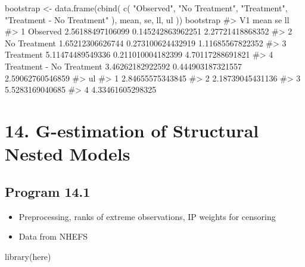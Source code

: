 \documentclass[
  10pt,
  a4paper,
]{book}
\newenvironment{Shaded}{\begin{snugshade}}{\end{snugshade}}
\newcommand{\CommentTok}[1]{\textcolor[rgb]{0.37,0.37,0.37}{#1}}
\newcommand{\FunctionTok}[1]{\textcolor[rgb]{0.28,0.35,0.67}{#1}}
\newcommand{\NormalTok}[1]{\textcolor[rgb]{0.00,0.46,0.62}{#1}}
\newcommand{\OtherTok}[1]{\textcolor[rgb]{0.00,0.46,0.62}{#1}}
\newcommand{\StringTok}[1]{\textcolor[rgb]{0.13,0.47,0.30}{#1}}
\providecommand{\tightlist}{%
  \setlength{\itemsep}{0pt}\setlength{\parskip}{0pt}}
\begin{document}
\begin{Shaded}
\begin{Highlighting}[]
\NormalTok{bootstrap }\OtherTok{\textless{}{-}}
  \FunctionTok{data.frame}\NormalTok{(}\FunctionTok{cbind}\NormalTok{(}
    \FunctionTok{c}\NormalTok{(}
      \StringTok{"Observed"}\NormalTok{,}
      \StringTok{"No Treatment"}\NormalTok{,}
      \StringTok{"Treatment"}\NormalTok{,}
      \StringTok{"Treatment {-} No Treatment"}
\NormalTok{    ),}
\NormalTok{    mean,}
\NormalTok{    se,}
\NormalTok{    ll,}
\NormalTok{    ul}
\NormalTok{  ))}
\NormalTok{bootstrap}
\CommentTok{\#\textgreater{}                         V1             mean                se               ll}
\CommentTok{\#\textgreater{} 1                 Observed 2.56188497106099 0.145242863962251 2.27721418868352}
\CommentTok{\#\textgreater{} 2             No Treatment 1.65212306626744 0.273100624432919 1.11685567822352}
\CommentTok{\#\textgreater{} 3                Treatment 5.11474489549336 0.211010004182399 4.70117288691821}
\CommentTok{\#\textgreater{} 4 Treatment {-} No Treatment 3.46262182922592 0.444903187321557 2.59062760546859}
\CommentTok{\#\textgreater{}                 ul}
\CommentTok{\#\textgreater{} 1 2.84655575343845}
\CommentTok{\#\textgreater{} 2 2.18739045431136}
\CommentTok{\#\textgreater{} 3  5.5283169040685}
\CommentTok{\#\textgreater{} 4 4.33461605298325}
\end{Highlighting}
\end{Shaded}

\chapter*{14. G-estimation of Structural Nested Models}\label{g-estimation-of-structural-nested-models}

\section{Program 14.1}\label{program-14.1}

\begin{itemize}
\tightlist
\item
  Preprocessing, ranks of extreme observations, IP weights for censoring
\item
  Data from NHEFS
\end{itemize}

\begin{Shaded}
\begin{Highlighting}[]
\FunctionTok{library}\NormalTok{(here)}
\end{Highlighting}
\end{Shaded}
\end{document}
